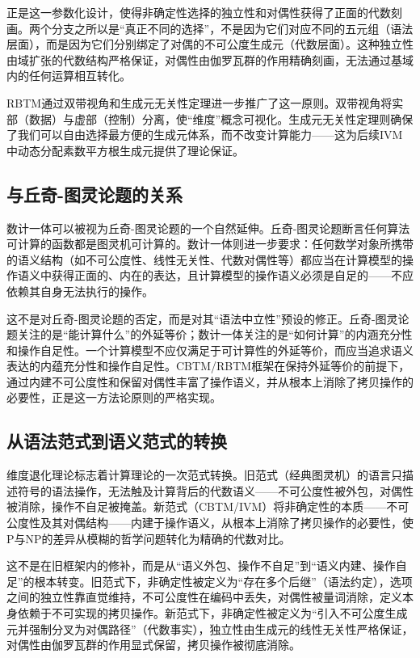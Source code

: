 \documentclass{ctexart}
\begin{document}
	正是这一参数化设计，使得非确定性选择的独立性和对偶性获得了正面的代数刻画。两个分支之所以是``真正不同的选择''，不是因为它们对应不同的五元组（语法层面），而是因为它们分别绑定了对偶的不可公度生成元（代数层面）。这种独立性由域扩张的代数结构严格保证，对偶性由伽罗瓦群的作用精确刻画，无法通过基域内的任何运算相互转化。
	
	RBTM通过双带视角和生成元无关性定理进一步推广了这一原则。双带视角将实部（数据）与虚部（控制）分离，使``维度''概念可视化。生成元无关性定理则确保了我们可以自由选择最方便的生成元体系，而不改变计算能力——这为后续IVM中动态分配素数平方根生成元提供了理论保证。
	
	\subsection{与丘奇-图灵论题的关系}
	
	数计一体可以被视为丘奇-图灵论题的一个自然延伸。丘奇-图灵论题断言任何算法可计算的函数都是图灵机可计算的。数计一体则进一步要求：任何数学对象所携带的语义结构（如不可公度性、线性无关性、代数对偶性等）都应当在计算模型的操作语义中获得正面的、内在的表达，且计算模型的操作语义必须是自足的——不应依赖其自身无法执行的操作。
	
	这不是对丘奇-图灵论题的否定，而是对其``语法中立性''预设的修正。丘奇-图灵论题关注的是``能计算什么''的外延等价；数计一体关注的是``如何计算''的内涵充分性和操作自足性。一个计算模型不应仅满足于可计算性的外延等价，而应当追求语义表达的内蕴充分性和操作自足性。CBTM/RBTM框架在保持外延等价的前提下，通过内建不可公度性和保留对偶性丰富了操作语义，并从根本上消除了拷贝操作的必要性，正是这一方法论原则的严格实现。
	
	\subsection{从语法范式到语义范式的转换}
	
	维度退化理论标志着计算理论的一次范式转换。旧范式（经典图灵机）的语言只描述符号的语法操作，无法触及计算背后的代数语义——不可公度性被外包，对偶性被消除，操作不自足被掩盖。新范式（CBTM/IVM）将非确定性的本质——不可公度性及其对偶结构——内建于操作语义，从根本上消除了拷贝操作的必要性，使P与NP的差异从模糊的哲学问题转化为精确的代数对比。
	
	这不是在旧框架内的修补，而是从``语义外包、操作不自足''到``语义内建、操作自足''的根本转变。旧范式下，非确定性被定义为``存在多个后继''（语法约定），选项之间的独立性靠直觉维持，不可公度性在编码中丢失，对偶性被量词消除，定义本身依赖于不可实现的拷贝操作。新范式下，非确定性被定义为``引入不可公度生成元并强制分叉为对偶路径''（代数事实），独立性由生成元的线性无关性严格保证，对偶性由伽罗瓦群的作用显式保留，拷贝操作被彻底消除。
	
\end{document}
